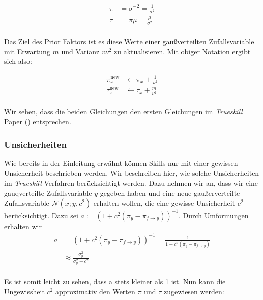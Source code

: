 \documentclass[12pt,a4paper]{scrartcl}
\numberwithin{equation}{section}
\begin{document}
 \begin{equation}
  \begin{split}
    \pi &= \sigma^{-2} = \frac{1}{\sigma^2} \\
    \tau &= \pi \mu = \frac{\mu}{\sigma^2} \\
   \end{split} 
 \end{equation}
 
 Das Ziel des Prior Faktors ist es diese Werte einer gaußverteilten Zufallsvariable mit Erwartung $m$ und Varianz $v\nu^2$ zu aktualisieren. 
 Mit obiger Notation ergibt sich also:
 
 \begin{equation}
  \begin{split}
    \pi_x^{\text{new}} &\leftarrow \pi_x + \frac{1}{\nu^2} \\
    \tau_x^{\text{new}} &\leftarrow \tau_x + \frac{m}{\nu^2} \\
  \end{split}
 \end{equation}

  Wir sehen, dass die beiden Gleichungen den ersten Gleichungen im \textit{Trueskill} Paper () entsprechen. 
  
  \subsubsection{Unsicherheiten}
  
  Wie bereits in der Einleitung erwähnt können Skills nur mit einer gewissen Unsicherheit beschrieben werden. Wir beschreiben hier, wie solche Unsicherheiten im \textit{Trueskill} Verfahren
  berücksichtigt werden. 
  Dazu nehmen wir an, dass wir eine gauqverteilte Zufallsvariable $y$ gegeben haben und eine neue gaußerverteilte Zufallsvariable $\mathcal{N}(x;y,c^2)$ erhalten wollen, die eine gewisse Unsicherheit
  $c^2$ berücksichtigt.  
  Dazu sei $a := (1+c^2(\pi_y - \pi_{f \rightarrow y}))^{-1}$.
  Durch Umformungen erhalten wir
  \begin{equation}
  \begin{split}
   a &= (1+c^2(\pi_y - \pi_{f \rightarrow y}))^{-1} = \frac{1}{1+c^2(\pi_y - \pi_{f \rightarrow y})} \\
   &\approx \frac{\sigma_y^2}{\sigma_y^2 + c^2} \\
  \end{split}
  \end{equation}
  
  Es ist somit leicht zu sehen, dass a stets kleiner als 1 ist. Nun kann die Ungewissheit $c^2$ approximativ den Werten $\pi$ und $\tau$ zugewiesen werden: 
  
\end{document}
